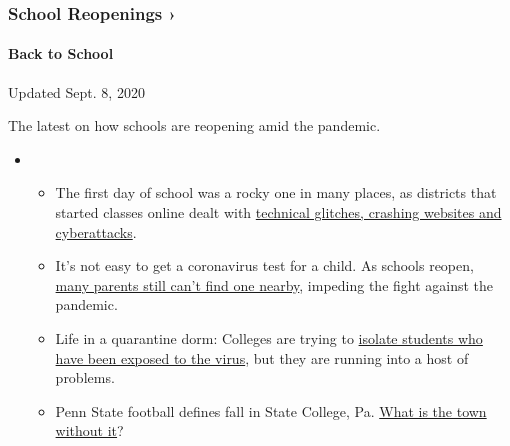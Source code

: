 \hypertarget{school-reopenings-}{%
\subsubsection{School Reopenings ›}\label{school-reopenings-}}

\hypertarget{back-to-school}{%
\paragraph{Back to School}\label{back-to-school}}

Updated Sept. 8, 2020

The latest on how schools are reopening amid the pandemic.

\begin{itemize}
\item
  \begin{itemize}
  \tightlist
  \item
    The first day of school was a rocky one in many places, as districts
    that started classes online dealt with
    \href{https://www.nytimes3xbfgragh.onion/2020/09/08/us/school-districts-cyberattacks-glitches.html?action=click\&pgtype=Article\&state=default\&region=MAIN_CONTENT_3\&context=storylines_keepup}{technical
    glitches, crashing websites and cyberattacks}.
  \item
    It's not easy to get a coronavirus test for a child. As schools
    reopen,
    \href{https://www.nytimes3xbfgragh.onion/2020/09/08/upshot/children-testing-shortfalls-virus.html?action=click\&pgtype=Article\&state=default\&region=MAIN_CONTENT_3\&context=storylines_keepup}{many
    parents still can't find one nearby}, impeding the fight against the
    pandemic.
  \item
    Life in a quarantine dorm: Colleges are trying to
    \href{https://www.nytimes3xbfgragh.onion/2020/09/09/business/colleges-coronavirus-dormitories-quarantine.html?action=click\&pgtype=Article\&state=default\&region=MAIN_CONTENT_3\&context=storylines_keepup}{isolate
    students who have been exposed to the virus}, but they are running
    into a host of problems.
  \item
    Penn State football defines fall in State College, Pa.
    \href{https://www.nytimes3xbfgragh.onion/2020/09/09/sports/penn-state-college-football-canceled.html?action=click\&pgtype=Article\&state=default\&region=MAIN_CONTENT_3\&context=storylines_keepup}{What
    is the town without it}?
  \end{itemize}
\end{itemize}

